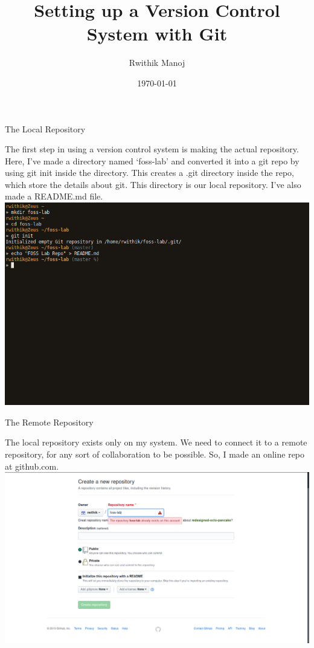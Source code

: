 \documentclass[10pt,a4paper,titlepage]{report}
\begin{document}
\begin{titlepage}
\author{Rwithik Manoj}
\title{Setting up a Version Control System with Git}
\date{\today}
\maketitle
\end{titlepage}
\begin{center}
\Large{The Local Repository}
\end{center}
\vspace{.5cm}
\par The first step in using a version control system is making the actual repository. Here, I've made a directory named `foss-lab' and converted it into a git repo by using {\color{red} git init} inside the directory. This creates a .git directory inside the repo, which store the details about git. This directory is our local repository. I've also made a README.md file. \newline
\newline
\includegraphics[scale=.45]{../Images/VCS/1.png}
\pagebreak
\begin{center}
\Large{The Remote Repository}
\end{center}
\vspace{.5cm}
\par The local repository exists only on my system. We need to connect it to a remote repository, for any sort of collaboration to be possible. So, I made an online repo at github.com. \newline\newline
\includegraphics[scale=.25]{../Images/VCS/github.png}\newline
\end{document}
